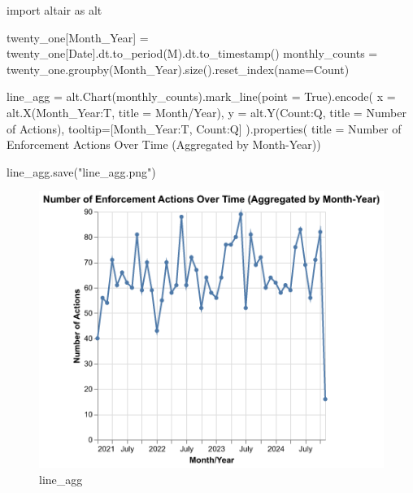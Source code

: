 \documentclass[
  letterpaper,
  DIV=11,
  numbers=noendperiod]{scrartcl}
\newenvironment{Shaded}{\begin{snugshade}}{\end{snugshade}}
\newcommand{\ImportTok}[1]{\textcolor[rgb]{0.00,0.46,0.62}{#1}}
\newcommand{\NormalTok}[1]{\textcolor[rgb]{0.00,0.23,0.31}{#1}}
\newcommand{\OperatorTok}[1]{\textcolor[rgb]{0.37,0.37,0.37}{#1}}
\newcommand{\StringTok}[1]{\textcolor[rgb]{0.13,0.47,0.30}{#1}}
\newcommand{\VariableTok}[1]{\textcolor[rgb]{0.07,0.07,0.07}{#1}}
\begin{document}
\begin{Shaded}
\begin{Highlighting}[]
\ImportTok{import}\NormalTok{ altair }\ImportTok{as}\NormalTok{ alt}

\NormalTok{twenty\_one[}\StringTok{\textquotesingle{}Month\_Year\textquotesingle{}}\NormalTok{] }\OperatorTok{=}\NormalTok{ twenty\_one[}\StringTok{\textquotesingle{}Date\textquotesingle{}}\NormalTok{].dt.to\_period(}\StringTok{\textquotesingle{}M\textquotesingle{}}\NormalTok{).dt.to\_timestamp()}
\NormalTok{monthly\_counts }\OperatorTok{=}\NormalTok{ twenty\_one.groupby(}\StringTok{\textquotesingle{}Month\_Year\textquotesingle{}}\NormalTok{).size().reset\_index(name}\OperatorTok{=}\StringTok{\textquotesingle{}Count\textquotesingle{}}\NormalTok{)}

\NormalTok{line\_agg }\OperatorTok{=}\NormalTok{ alt.Chart(monthly\_counts).mark\_line(point }\OperatorTok{=} \VariableTok{True}\NormalTok{).encode(}
\NormalTok{  x }\OperatorTok{=}\NormalTok{ alt.X(}\StringTok{\textquotesingle{}Month\_Year:T\textquotesingle{}}\NormalTok{, title }\OperatorTok{=} \StringTok{\textquotesingle{}Month/Year\textquotesingle{}}\NormalTok{),}
\NormalTok{  y }\OperatorTok{=}\NormalTok{ alt.Y(}\StringTok{\textquotesingle{}Count:Q\textquotesingle{}}\NormalTok{, title }\OperatorTok{=} \StringTok{\textquotesingle{}Number of Actions\textquotesingle{}}\NormalTok{),}
\NormalTok{  tooltip}\OperatorTok{=}\NormalTok{[}\StringTok{\textquotesingle{}Month\_Year:T\textquotesingle{}}\NormalTok{, }\StringTok{\textquotesingle{}Count:Q\textquotesingle{}}\NormalTok{]}
\NormalTok{).properties( title }\OperatorTok{=} \StringTok{\textquotesingle{}Number of Enforcement Actions Over Time (Aggregated by Month{-}Year)\textquotesingle{}}\NormalTok{)}

\NormalTok{line\_agg.save(}\StringTok{"line\_agg.png"}\NormalTok{)}
\end{Highlighting}
\end{Shaded}

\begin{figure}[H]

{\centering \includegraphics{line_agg.png}

}

\caption{line\_agg}

\end{figure}%
\end{document}
